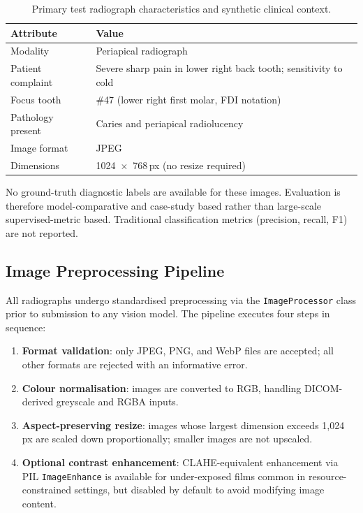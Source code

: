\documentclass[12pt,a4paper]{report}
\begin{document}
	\begin{table}[H]
		\centering
		\caption{Primary test radiograph characteristics and synthetic clinical context.}
		\label{tab:test_image}
		\small
		\begin{tabular}{@{}ll@{}}
			\toprule
			\textbf{Attribute} & \textbf{Value} \\
			\midrule
			Modality            & Periapical radiograph \\
			Patient complaint   & Severe sharp pain in lower right back tooth; sensitivity to cold \\
			Focus tooth         & \#47 (lower right first molar, FDI notation) \\
			Pathology present   & Caries and periapical radiolucency \\
			Image format        & JPEG \\
			Dimensions          & 1024~$\times$~768\,px (no resize required) \\
			\bottomrule
		\end{tabular}
	\end{table}
	
	No ground-truth diagnostic labels are available for these images.
	Evaluation is therefore model-comparative and case-study based rather
	than large-scale supervised-metric based.  Traditional classification
	metrics (precision, recall, F1) are not reported.
	
	\subsection{Image Preprocessing Pipeline}
	\label{subsec:preproc}
	
	All radiographs undergo standardised preprocessing via the
	\texttt{ImageProcessor} class prior to submission to any vision model.
	The pipeline executes four steps in sequence:
	
	\begin{enumerate}
		\item \textbf{Format validation}: only JPEG, PNG, and WebP files are
		accepted; all other formats are rejected with an informative
		error.
		\item \textbf{Colour normalisation}: images are converted to RGB,
		handling DICOM-derived greyscale and RGBA inputs.
		\item \textbf{Aspect-preserving resize}: images whose largest
		dimension exceeds 1,024 px are scaled down proportionally;
		smaller images are not upscaled.
		\item \textbf{Optional contrast enhancement}: CLAHE-equivalent
		enhancement via PIL \texttt{ImageEnhance} is available for
		under-exposed films common in resource-constrained settings,
		but disabled by default to avoid modifying image content.
	\end{enumerate}
	
\end{document}
